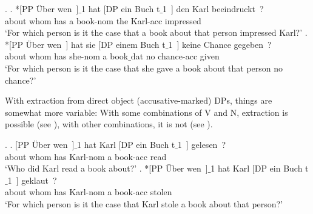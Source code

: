\documentclass[output=paper
,modfonts
,nonflat]{langsci/langscibook}
\begin{document}
\Lsciexi.
\ag. *[PP \"Uber wen~]$\_$1 \label{35a}hat [DP ein Buch t$\_$1~] den Karl beeindruckt~?\\
{} about whom has {} a book-{\sc nom} {} the Karl-{\sc acc} impressed\\
`For which person is it the case that a book about that person
impressed Karl?'
\bg. *[PP \"Uber wen~] hat \label{35b}sie [DP einem Buch t$\_$1~] keine Chance
gegeben~?\\
{} about whom has she-{\sc nom} {} a book$\_${dat} {} no chance-{\sc acc} given\\
`For which person is it the case that she gave a book about that
person no chance?'

With extraction from direct object (accusative-marked) DPs, things are
somewhat more variable: With some combinations of V and N, extraction
is possible (see \Next[a]), with other combinations, it is not (see
\Next[b]). 

\Lsciexi.
\ag. [PP \"Uber wen~]$\_$1 \label{36a}hat Karl [DP ein Buch t$\_$1~] gelesen~?\\
{} about whom has Karl-{\sc nom} {} a book-{\sc acc} {} read\\
`Who did Karl read a book about?'
\bg. *[PP \"Uber wen~]$\_$1 \label{36b}hat Karl [DP ein Buch t$\_$1~] geklaut~?\\
{} about whom has Karl-{\sc nom} {} a book-{\sc acc} {} stolen\\
`For which person is it the case that Karl stole a book about that person?'
\end{document}
